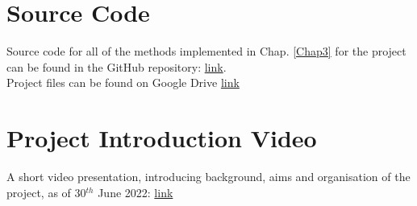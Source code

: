 \documentclass[12pt, a4paper]{report}
\begin{document}
\begin{appendices}
\chapter{Source Code} \label{System Requirements}
Source code for all of the methods implemented in Chap. \ref{Chap3} for the project can be found in the GitHub repository: \newline \url{link}. \newline \\
Project files can be found on Google Drive \url{link}


\chapter{Project Introduction Video}\label{sec:projectIntroduction}
A short video presentation, introducing background, aims and organisation of the project, as of 30$^{th}$ June 2022: \newline
\url{link}
\\
\\
\\


\end{appendices}
\clearpage
\printglossaries

\end{document}
